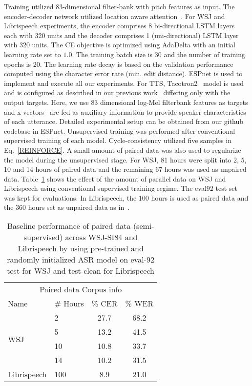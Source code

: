 \documentclass[a4paper]{article}
\begin{document}
Training utilized 83-dimensional filter-bank with pitch features as input. 
The encoder-decoder network utilized location aware attention~\cite{bahdanau2016end}. For WSJ and Librispeech experiments, the encoder comprises 8 bi-directional LSTM layers~\cite{schuster1997bidirectional,hochreiter1997long} each with 320 units and the decoder comprises 1 (uni-directional) LSTM layer with 320 units. The CE objective is optimized using AdaDelta \cite{zeilerAdaDelta} with an initial learning rate set to $1.0$. The training batch size is 30 and the number of training epochs is 20. The learning rate decay is based on the validation performance computed using the character error rate (min. edit distance). ESPnet \cite{watanabe2018espnet} is used to implement and execute all our experiments.
For TTS, Tacotron2~\cite{shen2018natural} model is used and is configured as described in our previous work~\cite{hori2018cycle} differing only with the output targets. Here, we use 83 dimensional log-Mel filterbank features as targets and x-vectors~\cite{snyder2018x} are fed as auxiliary information to provide speaker characteristics of each utterance.
Detailed experimental setup can be obtained from our github codebase in ESPnet. Unsupervised training was performed after conventional supervised training of each model.
Cycle-consistency utilized five samples in Eq.~\ref{REINFORCE}. A small amount of paired data was also used to regularize the model during the unsupervised stage. For WSJ, 81 hours were split into 2, 5, 10 and 14 hours of paired data and the remaining 67 hours was used as unpaired data. Table~\ref{tab:pretrain} shows the effect of the amount of parallel data on WSJ and Librispeech using conventional supervised training regime. The eval92 test set was kept for evaluations. In Librispeech, the 100 hours is used as paired data and the 360 hours set as unpaired data as in~\cite{hori2018cycle}. 
\begin{table}[H]
\caption{Baseline performance of paired data (semi-supervised) across WSJ-SI84 and Librispeech by using pre-trained and randomly initialized ASR model on eval-92 test for WSJ and test-clean for Librispeech}\label{tab:pretrain}
\centering{}{\footnotesize{}}\begin{tabular}{llcc}
\hline 
\multicolumn{4}{c}{{\footnotesize{}Paired data Corpus info  }}\tabularnewline
{\footnotesize{}Name} & {\footnotesize{}\# Hours} & {\footnotesize{}\% CER} & {\footnotesize{}\% WER}\tabularnewline
\hline 
\hline 
\multirow{4}{*}{{\footnotesize{}WSJ}} & {\footnotesize{}2} & {\footnotesize{}27.7} & {\footnotesize{}68.2}\tabularnewline
 & {\footnotesize{}5} & {\footnotesize{}13.2} & {\footnotesize{}41.5}\tabularnewline
 & {\footnotesize{}10} & {\footnotesize{}10.8} & {\footnotesize{}33.7}\tabularnewline
 & {\footnotesize{}14} & {\footnotesize{}10.2} & {\footnotesize{}31.5}\tabularnewline
{\footnotesize{}Librispeech} & {\footnotesize{}100} & {\footnotesize{}8.9} & {\footnotesize{}21.0}\tabularnewline
\hline 
\end{tabular}{\footnotesize \par}
\end{table}
\end{document}
